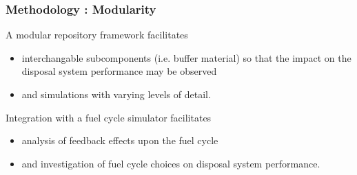
\begin{frame}[ctb!]
  \frametitle{Methodology : Modularity }
  A modular repository framework facilitates 
  \begin{itemize}
    \item  interchangable subcomponents (i.e. buffer material) so that 
      the impact on the disposal system performance may be observed
    \item and simulations with varying levels of detail.
  \end{itemize}
 \pause
  Integration with a fuel cycle simulator facilitates
  \begin{itemize}
    \item analysis of feedback effects upon the fuel cycle
    \item and investigation of fuel cycle choices on disposal system 
      performance.
  \end{itemize}
\end{frame}

